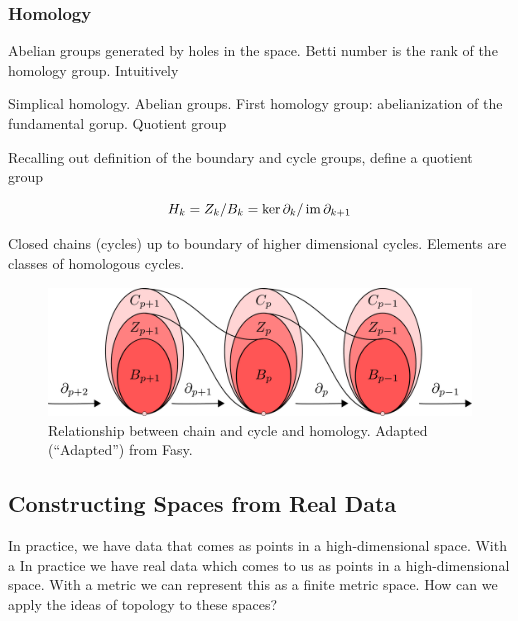 \begin{figure}
\centering
\caption[]{}
\label{background:fig:boundary_example}
\end{figure}

\subsubsection{Homology}

Abelian groups generated by holes in the space.
Betti number is the rank of the homology group.
Intuitively

Simplical homology.
Abelian groups.
First homology group: abelianization of the fundamental gorup.
Quotient group

Recalling out definition of the boundary and cycle groups, define a quotient group

\begin{equation}
H_{k} = Z_{k} / B_{k} = \ker\partial_{k} / \operatorname{im}\partial_{k+1}
\end{equation}

Closed chains (cycles) up to boundary of higher dimensional cycles.
Elements are classes of homologous cycles.

\begin{figure}
\centering\includegraphics[width=\columnwidth]{./fig/FASY_chain_complexes.pdf}
\caption{Relationship between chain and cycle and homology. Adapted (``Adapted'') from Fasy.}
\label{fig:chain_complexes}
\end{figure}


\subsection{Constructing Spaces from Real Data}

In practice, we have data that comes as points in a high-dimensional space.
With a
In practice we have real data which comes to us as points in a high-dimensional space.
With a metric we can represent this as a finite metric space.
How can we apply the ideas of topology to these spaces?

